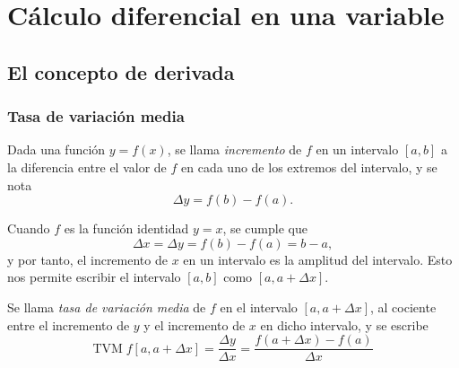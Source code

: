 \section{Cálculo diferencial en una variable}


\subsection{El concepto de derivada}
\begin{frame}
	\frametitle{Tasa de variación media}
	\begin{definicion}[Incremento]
		Dada una función $y=f(x)$, se llama \emph{incremento} de $f$ en un intervalo $[a,b]$ a la diferencia entre el valor de $f$ en cada uno de los extremos del intervalo, y se nota
		\[\Delta y= f(b)-f(a).\]
	\end{definicion}
	
	Cuando $f$ es la función identidad $y=x$, se cumple que
	\[\Delta x=\Delta y= f(b)-f(a)=b-a,\]
	y por tanto, el incremento de $x$ en un intervalo es la amplitud del intervalo. Esto nos permite escribir el intervalo $[a,b]$ como $[a,a+\Delta x]$.
	
	\begin{definicion}
		Se llama \emph{tasa de variación media} de $f$ en el intervalo $[a,a+\Delta x]$, al cociente entre el incremento de $y$ y el incremento de $x$ en dicho intervalo, y se escribe
		\[
			\textrm{TVM}\;f[a,a+\Delta x]=\frac{\Delta y}{\Delta x}=\frac{f(a+\Delta x)-f(a)}{\Delta x}
		\]
	\end{definicion}
\end{frame}



